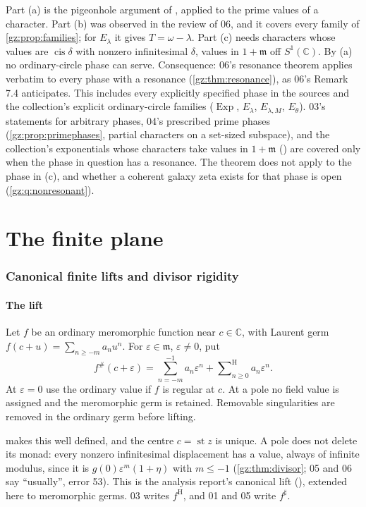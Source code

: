 \documentclass[11pt,a4paper]{article}
\numberwithin{equation}{section}
\theoremstyle{definition}
\theoremstyle{remark}
\newcommand{\C}{\mathbb C}
\newcommand{\mm}{\mathfrak m}
\newcommand{\eps}{\varepsilon}
\newcommand{\st}{\operatorname{st}}
\newcommand{\cis}{\operatorname{cis}}
\newcommand{\Exp}{\operatorname{Exp}}
\newcommand{\Sh}{\mathop{\textstyle\sum}\nolimits^{\mathrm H}}
\newcommand{\src}[1]{\textup{[#1]}}
\begin{document}
Part (a) is the pigeonhole argument of ,
applied to the prime values of a character. Part (b) was observed in the
review of 06, and it covers every family of \cref{gz:prop:families}; for
$E_\lambda$ it gives $T=\omega-\lambda$. Part (c) needs characters whose
values are $\cis\delta$ with nonzero infinitesimal $\delta$, values in
$1+\mm$ off $S^1(\C)$. By (a) no ordinary-circle phase can serve.
Consequence: 06's resonance theorem applies verbatim to every phase with a
resonance (\cref{gz:thm:resonance}), as 06's Remark 7.4 anticipates. This
includes every explicitly specified phase in the sources and the
collection's explicit ordinary-circle families ($\Exp$, $E_\lambda$,
$E_{\lambda,M}$, $E_\theta$). 03's statements for arbitrary phases, 04's
prescribed prime phases (\cref{gz:prop:primephases}, partial characters on
a set-sized subspace), and the collection's exponentials whose characters
take values in $1+\mm$ () are covered
only when the phase in question has a resonance. The theorem does not apply
to the phase in (c), and whether a coherent galaxy zeta exists for that
phase is open (\cref{gz:q:nonresonant}).

\part{The finite plane}\label{gz:part:finite}

\section{Canonical finite lifts and divisor rigidity}\label{gz:sec:finite}

\subsection{The lift}
\begin{definition}[Canonical finite lift \src{01--06}]\label{gz:def:lift}
Let $f$ be an ordinary meromorphic function near $c\in\C$, with Laurent
germ $f(c+u)=\sum_{n\ge-m}a_nu^n$. For $\eps\in\mm$, $\eps\ne0$, put
\[
f^\#(c+\eps)=\sum_{n=-m}^{-1}a_n\eps^n+\Sh_{n\ge0}a_n\eps^n .
\]
At $\eps=0$ use the ordinary value if $f$ is regular at $c$. At a pole no
field value is assigned and the meromorphic germ is retained. Removable
singularities are removed in the ordinary germ before lifting.
\end{definition}
 makes this well defined, and the centre
$c=\st z$ is unique. A pole does not delete its monad: every nonzero
infinitesimal displacement has a value, always of infinite modulus, since
it is $g(0)\eps^{m}(1+\eta)$ with $m\le-1$ (\cref{gz:thm:divisor}; 05 and
06 say ``usually'', error 53). This is the analysis report's canonical
lift (), extended here to meromorphic germs. 03 writes
$f^{\mathrm H}$, and 01 and 05 write $f^\sharp$.
\end{document}
